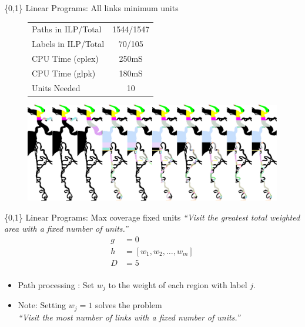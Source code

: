 \documentclass{beamer}
\begin{document}
\begin{frame}{\{0,1\} Linear Programs: All links minimum units}
\begin{figure}
  \begin{tabular}{|l|c|}
  \hline 
  Paths in ILP/Total & 1544/1547 \\
  Labels in ILP/Total & 70/105 \\
  CPU Time (cplex) & 250mS\\
  CPU Time (glpk) & 180mS \\
  Units Needed & 10 \\
  \hline
  \end{tabular}
\end{figure}

  \begin{figure}
     {\includegraphics[width=1\textwidth]{figures/all_links_minimum_units_paths.png}}
  \end{figure}
\end{frame}


\begin{frame}{\{0,1\} Linear Programs: Max coverage fixed units}
\emph{``Visit the greatest total weighted area with a fixed number of units.''}
\begin{align*}
g &= 0\\
h &= \left[ w_1,w_2, \dots ,w_m\right]\\
D &= 5\\
\end{align*}

\begin{itemize}
 \item Path processing : Set $w_j$ to the weight of each region with label $j$.
 \item Note: Setting $w_j=1$ solves the problem\\ \emph{``Visit the most number of links with a fixed number of units.''}
\end{itemize}
\end{frame}
\end{document}
